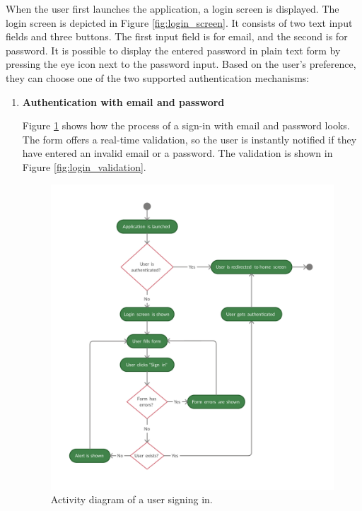 \documentclass[
  digital, %
  table,   %
  oneside, %
  lof,     %
  lot,     %
]{fithesis3}
\begin{document}
When the user first launches the application, a login screen is displayed. The login screen is depicted in Figure \ref{fig:login_screen}. It consists of two text input fields and three buttons. The first input field is for email, and the second is for password. It is possible to display the entered password in plain text form by pressing the eye icon next to the password input. Based on the user's preference, they can choose one of the two supported authentication mechanisms:

\begin{enumerate}
    \item \textbf{Authentication with email and password}
    
    Figure \ref{fig:sign_in_flow} shows how the process of a sign-in with email and password looks. The form offers a real-time validation, so the user is instantly notified if they have entered an invalid email or a password. The validation is shown in Figure \ref{fig:login_validation}.
    
    \begin{figure}
        \begin{center}
            \includegraphics[width=\textwidth]{figures/diagrams/Sign_in_flow}
        \end{center}
        \caption{Activity diagram of a user signing in.}
        \label{fig:sign_in_flow}
    \end{figure}
    

\end{enumerate}
\end{document}
